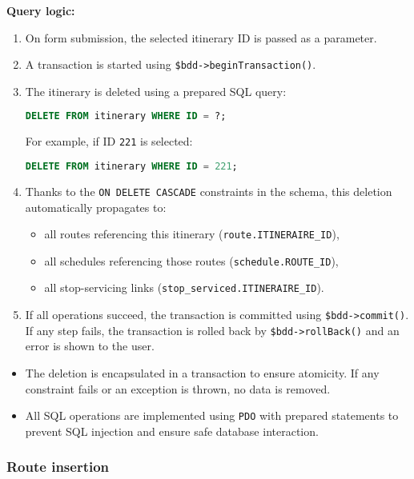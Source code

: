\documentclass[a4paper, 12pt]{article}
\begin{document}
\textbf{Query logic:}
\begin{enumerate}
    \item On form submission, the selected itinerary ID is passed as a parameter.
    \item A transaction is started using \texttt{\$bdd->beginTransaction()}.
    \item The itinerary is deleted using a prepared SQL query:
    \begin{lstlisting}[language=SQL]
DELETE FROM itinerary WHERE ID = ?;
    \end{lstlisting}
    For example, if ID \texttt{221} is selected:
    \begin{lstlisting}[language=SQL]
DELETE FROM itinerary WHERE ID = 221;
    \end{lstlisting}

    \item Thanks to the \texttt{ON DELETE CASCADE} constraints in the schema, this deletion automatically propagates to:
    \begin{itemize}
        \item all routes referencing this itinerary (\texttt{route.ITINERAIRE\_ID}),
        \item all schedules referencing those routes (\texttt{schedule.ROUTE\_ID}),
        \item all stop-servicing links (\texttt{stop\_serviced.ITINERAIRE\_ID}).
    \end{itemize}

    \item If all operations succeed, the transaction is committed using \texttt{\$bdd->commit()}. If any step fails, the transaction is rolled back by \texttt{\$bdd->rollBack()} and an error is shown to the user.
\end{enumerate}

\begin{itemize}
    \item The deletion is encapsulated in a transaction to ensure atomicity. If any constraint fails or an exception is thrown, no data is removed.
    \item All SQL operations are implemented using \texttt{PDO} with prepared statements to prevent SQL injection and ensure safe database interaction.
\end{itemize}



\subsubsection{Route insertion}
\end{document}
